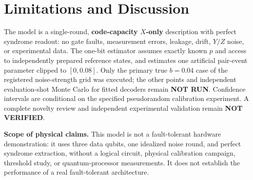 \documentclass[11pt,a4paper]{article}
\begin{document}
\begin{table}[htbp]
\centering
\caption{Contextual comparison with published quantum-error-correction research. The experimental studies are not directly comparable benchmarks for this three-qubit model.}
\label{tab:comparison}
\small
{}
\end{table}

\section{Limitations and Discussion}
The model is a single-round, \textbf{code-capacity $X$-only} description with perfect syndrome readout: no gate faults, measurement errors, leakage, drift, $Y/Z$ noise, or experimental data. The one-bit estimator assumes exactly known $p$ and access to independently prepared reference states, and estimates one artificial pair-event parameter clipped to $[0,0.08]$. Only the primary true $b=0.04$ case of the registered noise-strength grid was executed; the other points and independent evaluation-shot Monte Carlo for fitted decoders remain \textbf{NOT RUN}. Confidence intervals are conditional on the specified pseudorandom calibration experiment. A complete novelty review and independent experimental validation remain \textbf{NOT VERIFIED}.

\par\noindent\textbf{Scope of physical claims.} This model is not a fault-tolerant hardware demonstration: it uses three data qubits, one idealized noise round, and perfect syndrome extraction, without a logical circuit, physical calibration campaign, threshold study, or quantum-processor measurements. It does not establish the performance of a real fault-tolerant architecture.\par
\end{document}
